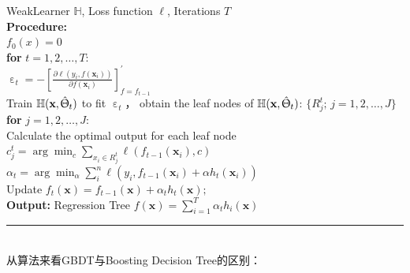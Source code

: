 \documentclass[a4paper]{article}
\begin{document}
		\hspace*{32pt}	WeakLearner $\mathbb{H}$, Loss function $\ell$, Iterations $T$\\
		\textbf{Procedure:} \\
			\hspace*{32pt} 	$f_0(x) = 0$\\
			\hspace*{32pt} 	\textbf{for} $t = 1, 2,\dots, T$:\\
					\hspace*{48pt} 	$\upepsilon_t = -[\frac{\partial \ell(y_i, f(\textbf{x}_i))}{\partial f(\textbf{x}_i)}]_{f=f_{t-1}}^{'}$\\
					\hspace*{48pt} 	Train $\mathbb{H}(\textbf{x},\hat{\Uptheta}_t)$ to fit $\upepsilon_t$，
									obtain the leaf nodes of $\mathbb{H}(\textbf{x},\hat{\Uptheta}_t)$: $\{R_j^t;\,j=1,2,\dots,J\}$\\
					\hspace*{48pt}	\textbf{for} $j=1,2,\dots,J$:\\
					\hspace*{64pt}	Calculate the optimal output for each leaf node\\
					\hspace*{64pt}	$c_j^t = \arg\min_c\sum_{x_i\in R_j^t}\ell(f_{t-1}(\textbf{x}_i),c)$\\
					\hspace*{48pt}	$\alpha_t = \arg\min_{\alpha}\sum_{i}^{n}\ell(y_i, f_{t-1}(\textbf{x}_i)+\alpha h_t(\textbf{x}_i))$\\
					\hspace*{48pt} 	Update $f_t(\textbf{x}) = f_{t-1}(\textbf{x})+\alpha_th_t(\textbf{x});$\\
		\textbf{Output:} Regression Tree $f(\textbf{x}) = \sum_{i=1}^{T}\alpha_th_i(\textbf{x})$\\
		\noindent\rule[0.10\baselineskip]{\textwidth}{0.75pt}\\
		从算法来看GBDT与Boosting Decision Tree的区别：
\end{document}
